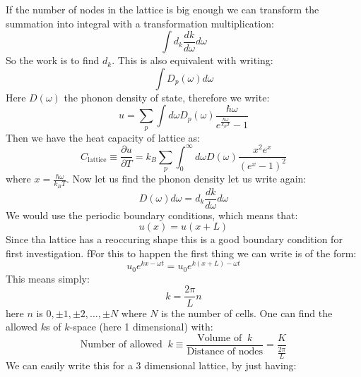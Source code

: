 \documentclass[9pt,a4paper, twocolumn]{article}
\begin{document}
     If the number of nodes in the lattice is big enough we can transform the summation into integral with a transformation multiplication:
     \begin{equation}
        \int  d_k \frac{dk}{d\omega}d\omega
     \end{equation}
     So the work is to find $d_k$. This is also equivalent with writing:
     \begin{equation}
        \int D_p(\omega)d\omega
     \end{equation}
     Here $D(\omega) $ the phonon density of state, therefore we write:
     \begin{equation}
        u = \sum_p\int d\omega D_p(\omega)\frac{\hbar \omega}{e^{\frac{\hbar\omega}{k_B T}}-1} 
     \end{equation}
     Then we have the heat capacity of lattice as:
     \begin{equation}
        C_{\text{lattice}} \equiv \frac{\partial u}{\partial T} = k_B \sum_p\int_0^\infty d\omega D(\omega)\frac{x^2 e^x}{(e^x - 1)^2}
     \end{equation}
     where $x = \frac{\hbar \omega}{k_B T}$. Now let us find the phonon density let us write again:
     \begin{equation}
        D(\omega)d\omega = d_k \frac{dk}{d\omega}d\omega
     \end{equation}
     We would use the periodic boundary conditions, which means that:
     \begin{equation}
        u(x) = u(x+L)
     \end{equation}
     Since tha lattice has a reoccuring shape this is a good boundary condition for first investigation. fFor this to happen the first thing we can write is of the form:
     \begin{equation}
        u_0 e^{kx-\omega t} = u_0 e^{k(x+L)-\omega t} 
     \end{equation}
     This means simply:
     \begin{equation}
        k = \frac{2\pi}{L}n 
     \end{equation}
     here $n$ is $0,\pm 1, \pm2, \dots, \pm N$ where $N$ is the number of cells. One can find the allowed $k$s of $k$-space (here 1 dimensional) with:
     \begin{equation}
        \text{Number of allowed } \ k \equiv \frac{\text{Volume of } \ k}{\text{Distance of nodes}} = \frac{K}{\frac{2\pi}{L}}
     \end{equation}
     We can easily write this for a $3$ dimensional lattice, by just having:
\end{document}
